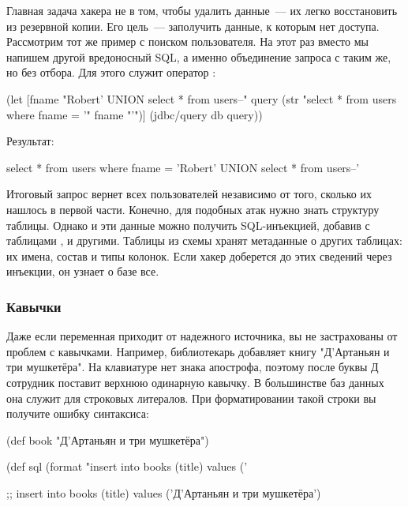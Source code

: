 Главная задача хакера не в том, чтобы удалить данные~--- их легко восстановить из резервной копии. Его цель~--- заполучить данные, к которым нет доступа. Рассмотрим тот же пример с поиском пользователя. На этот раз вместо  мы напишем другой вредоносный SQL, а именно объединение запроса с таким же, но без отбора. Для этого служит оператор :

\begin{english}
  \begin{clojure}
(let [fname "Robert' UNION select * from users--"
      query (str "select * from users where fname = '" fname "'")]
  (jdbc/query db query))
  \end{clojure}
\end{english}

Результат:

\begin{english}
  \begin{sql}
select * from users where fname = 'Robert' UNION select * from users--'
  \end{sql}
\end{english}

Итоговый запрос вернет всех пользователей независимо от того, сколько их нашлось в первой части. Конечно, для подобных атак нужно знать структуру таблицы. Однако и эти данные можно получить SQL-инъекцией, добавив  с таблицами ,  и другими. Таблицы из схемы  хранят метаданные о других таблицах: их имена, состав и типы колонок. Если хакер доберется до этих сведений через инъекции, он узнает о базе все.

\subsubsection{Кавычки}

Даже если переменная приходит от надежного источника, вы не застрахованы от проблем с кавычками. Например, библиотекарь добавляет книгу "Д’Артаньян и три мушкетёра". На клавиатуре нет знака апострофа, поэтому после буквы Д сотрудник поставит верхнюю одинарную кавычку. В большинстве баз данных она служит для строковых литералов. При форматировании такой строки вы получите ошибку синтаксиса:

  \begin{clojure}
(def book "Д'Артаньян и три мушкетёра")

(def sql (format "insert into books (title) values ('%

;; insert into books (title) values ('Д'Артаньян и три мушкетёра')
  \end{clojure}

